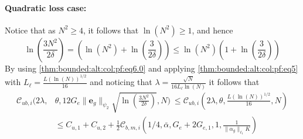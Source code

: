 \documentclass{article}
\newcommand{\e}{\mathbf{e}}
\begin{document}
      \paragraph{Quadratic loss case:}
            Notice that as $N^2 \ge 4$, it follows that $\ln(N^2) \ge 1$, and  hence
        \begin{equation} 
        \label{thm:bounded:alt:col:pf:eq6.0}
           \ln\left(\frac{3N^2}{2\delta}\right)=\left(\ln(N^2)+\ln\left(\frac{3}{2\delta}\right)\right)
            \le \ln(N^2)\left(1+\ln\left(\frac{3}{2\delta}\right)\right)
        \end{equation}
        By using \eqref{thm:bounded:alt:col:pf:eq6.0}
        and  applying \eqref{thm:bounded:alt:col:pf:eq5} with
      $L_{\ell}=\frac{L(\ln(N))^{1/2}}{16}$ and noticing that $\lambda=\frac{\sqrt{N}}{16 L_{\ell} \ln(N)}$
       it follows that
       \begin{equation}
        \label{thm:bounded:alt:col:pf:eq7}
        \begin{aligned}
           \mathcal{C}_{ub,i}(2\lambda, & \theta,12G_e\|\e_g\|_{\psi_2}\sqrt{\ln\left(\frac{3N^2}{2\delta}\right)},N)  \
           \le 
           \mathcal{C}_{ub,i}(2\lambda, \theta, \frac{L(\ln(N))^{1/2}}{16},N)  \\
            & \le C_{u,1}+C_{u,2}+\frac{1}{2}\mathcal{C}_{b,m,i}\left(1/4, \bar{\alpha}, G_e+2G_{e,1}, 1, \frac{1}{\|\alpha_g\|_{\ell_1}K}\right)
       \end{aligned}
       \end{equation}
\end{document}

